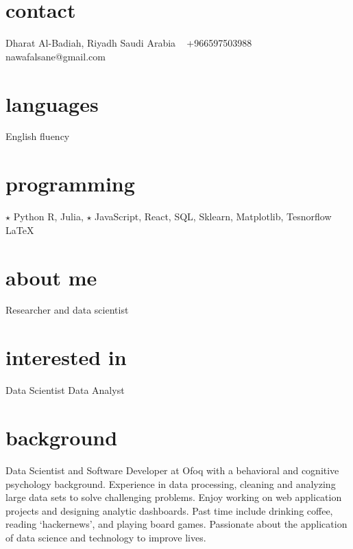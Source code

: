 \documentclass[]{cv-style}          %
\begin{document}
\lastupdated


\begin{aside}
%
\section{contact}
Dharat Al-Badiah, Riyadh 
Saudi Arabia
~
+966597503988
~
nawafalsane@gmail.com
%
\section{languages}
English  fluency
%
\section{programming}
{\color{red} $\star$} Python
R, Julia, {\color{red} $\star$} JavaScript, React, SQL, Sklearn, Matplotlib, Tesnorflow
\LaTeX{}
%
\section{about me}
Researcher and data scientist
%
\section{interested in} 
% 
\vspace{0.3cm}Data Scientist
Data Analyst
%
\end{aside}


\section{background}
  \vspace{-0.2cm}

\star
Data Scientist and Software Developer at Ofoq with a behavioral and cognitive psychology background. Experience in data processing, cleaning and analyzing large data sets to solve challenging problems.  Enjoy working on web application projects and designing analytic dashboards. Past time include drinking coffee, reading ‘hackernews’, and playing board games. Passionate about the application of data science and technology to improve lives.
\end{document}
